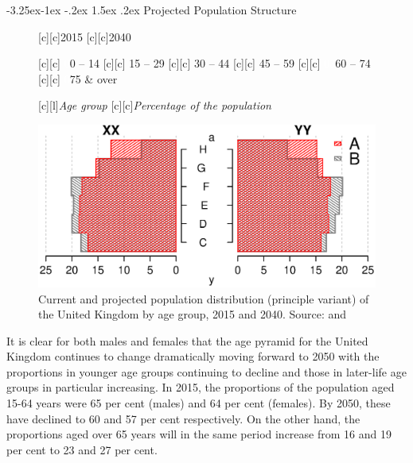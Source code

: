 \documentclass[11 pt, a4paper]{report}
\makeatletter
\renewcommand\subsection{\@startsection{subsection}{2}{\z@}%
                                     {-3.25ex\@plus -1ex \@minus -.2ex}%
                                     {1.5ex \@plus .2ex}%
    								{\large\scshape}}
\makeatother
\begin{document}
\subsection{Projected Population Structure}
\begin{figure}[hbtp!]

[c][c]{2015}
[c][c]{2040}

[c][c]{\scriptsize{ \textcolor{white}{0}0 -- 14}}
[c][c]{\scriptsize{ 15 -- 29}}
[c][c]{\scriptsize{ 30 -- 44}}
[c][c]{\scriptsize{ 45 -- 59}}
[c][c]{\scriptsize{ \textcolor{white}{03}60 -- 74}}
[c][c]{\scriptsize{ \textcolor{white}{0}75 \& over}}

[c][l]{\small{\emph{Age group}}}
[c][c]{\small{\emph{Percentage of the population}}}

\includegraphics[width=\textwidth]{../figures/Fig1.5.eps}
\caption{Current and projected population distribution (principle variant) of the United Kingdom by age group, 2015 and 2040. Source: \cite{ONS2013b} and  \cite{HMD2015} }\label{Fig:05.5}
\end{figure}

It is clear for both males and females that the age pyramid for the United Kingdom continues to change dramatically moving forward to 2050 with the proportions in younger age groups continuing to decline and those in later-life age groups in particular increasing. In 2015, the proportions of the population aged 15-64 years were 65 per cent (males) and 64 per cent (females). By 2050, these have declined to 60 and 57 per cent respectively. On the other hand, the proportions aged over 65 years will in the same period increase from 16 and 19 per cent to 23 and 27 per cent.
\end{document}
